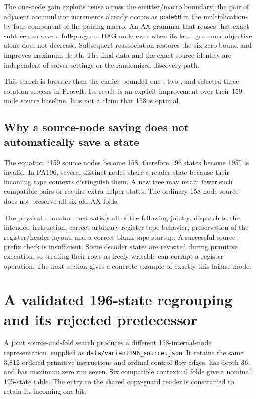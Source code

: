 \documentclass[11pt,letterpaper]{article}
\newcommand{\file}[1]{\texttt{\nolinkurl{#1}}}
\begin{document}
The one-node gain exploits reuse across the emitter/macro boundary:
the pair of adjacent accumulator increments already occurs as
\file{node60} in the multiplication-by-four component of the pairing macro.
An AX grammar that reuses that exact subtree can save a full-program DAG
node even when its local grammar objective alone does not decrease.
Subsequent reassociation restores the six-zero bound and improves maximum
depth. The final data and the exact source identity are independent of
solver settings or the randomized discovery path.

This search is broader than the earlier bounded one-, two-, and selected
three-rotation screens in ProveIt. Its result is an explicit improvement
over their 159-node source baseline. It is not a claim that 158 is optimal.

\subsection{Why a source-node saving does not automatically save a state}

The equation ``159 source nodes become 158, therefore 196 states become
195'' is invalid. In PA196, several distinct nodes share a reader state
because their incoming tape contexts distinguish them. A new tree may
retain fewer such compatible pairs or require extra helper states. The
ordinary 158-node source does not preserve all six old AX folds.

The physical allocator must satisfy all of the following jointly: dispatch
to the intended instruction, correct arbitrary-register tape behavior,
preservation of the register/header layout, and a correct blank-tape
startup. A successful source-prefix check is insufficient. Some decoder
states are revisited during primitive execution, so treating their rows
as freely writable can corrupt a register operation. The next section
gives a concrete example of exactly this failure mode.

\section{A validated 196-state regrouping and its rejected predecessor}

A joint source-and-fold search produces a different 158-internal-node
representation, supplied as \file{data/variant196_source.json}. It retains
the same 3,812 ordered primitive instructions and ordinal control-flow
edges, has depth 36, and has maximum zero run seven. Six compatible
contextual folds give a nominal 195-state table. The entry to the shared
copy-guard reader is constrained to retain its incoming one bit.
\end{document}
